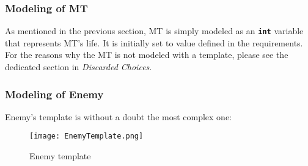 \documentclass[
10pt, %
a4paper, %
oneside, %
headinclude,footinclude, %
BCOR5mm, %
]{scrartcl}
\begin{document}
\subsubsection{Modeling of MT}
As mentioned in the previous section, MT is simply modeled as an \texttt{\textbf{int}} variable that represents MT's life. It is initially set to value defined in the requirements. For the reasons why the MT is not modeled with a template, please see the dedicated section in \emph{Discarded Choices}.

\subsubsection{Modeling of Enemy}
Enemy's template is without a doubt the most complex one:

\begin{figure}[h!]
	\centering
	\texttt{[image: EnemyTemplate.png]}
	\caption{Enemy template}
\end{figure}
\end{document}

